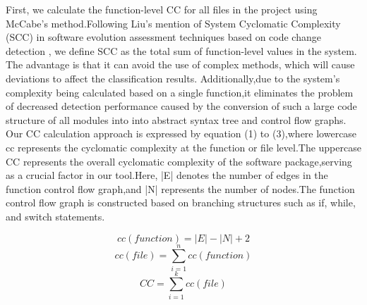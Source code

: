 \documentclass[sigconf,screen,review,anonymous]{acmart}
\begin{document}
First, we calculate the function-level CC for all files in the project using McCabe's method.Following Liu's mention of System Cyclomatic Complexity (SCC) in software evolution assessment techniques based on code change detection \cite{liuhuihui00}, we define SCC as the total sum of function-level values in the system.
  The advantage is that it can avoid the use of complex methods, which will cause deviations to affect the classification results.
  Additionally,due to the system's complexity being calculated based on a single function,it eliminates the problem of decreased detection performance caused by the conversion of such a large code structure of all modules into into abstract syntax tree and control flow graphs.
  Our CC calculation approach is expressed by equation (1) to (3),where lowercase cc represents the cyclomatic complexity at the function or file level.The uppercase CC represents the overall cyclomatic complexity of the software package,serving as a crucial factor in our tool.Here, |E| denotes the number of edges in the function control flow graph,and |N| represents the number of nodes.The function control flow graph is constructed based on branching structures such as if, while, and switch statements. 
  
  \begin{equation}
    {cc}({function}) = \lvert E \rvert - \lvert N \rvert + 2
    \end{equation}
    \begin{equation}
      {cc}({file}) =  \sum_{i=1}^{n} 
      {cc}({function})
      \end{equation}
      \begin{equation}
        {CC} =  \sum_{i=1}^{k} {cc}({file})
        \end{equation}
\end{document}

